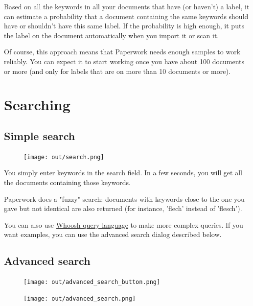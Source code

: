 \documentclass[10pt,a4paper]{article}
\begin{document}
Based on all the keywords in all your documents that have (or haven't) a label,
it can estimate a probability that a document containing the same keywords
should have or shouldn't have this same label. If the probability is high
enough, it puts the label on the document automatically when you import it or
scan it.

Of course, this approach means that Paperwork needs enough samples to work
reliably. You can expect it to start working once you have about 100 documents
or more (and only for labels that are on more than 10 documents or more).


\section{Searching}

\subsection{Simple search}

\begin{figure}[H]
	\texttt{[image: out/search.png]}
\end{figure}

You simply enter keywords in the search field. In a few seconds, you will get
all the documents containing those keywords.

Paperwork does a "fuzzy" search: documents with keywords close to the one you
gave but not identical are also returned (for instance, 'flech' instead of
'flesch').

You can also use
\href{https://whoosh.readthedocs.io/en/latest/querylang.html}{Whoosh query language}
to make more complex queries. If you want examples, you can use the advanced
search dialog described below.


\subsection{Advanced search}

\begin{figure}[H]
	\centering
	\begin{minipage}{.5\textwidth}
		\centering
		\texttt{[image: out/advanced\_search\_button.png]}
	\end{minipage}%
	\begin{minipage}{.5\textwidth}
		\centering
		\texttt{[image: out/advanced\_search.png]}
	\end{minipage}
\end{figure}
\end{document}
